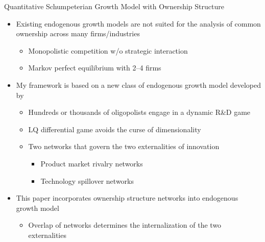 \documentclass[
  10pt,
  aspectratio=169,   %
]{beamer}
\theoremstyle{plain}
\begin{document}
\begin{frame}{Quantitative Schumpeterian Growth Model with Ownership Structure}
  \begin{itemize}
    \item Existing endogenous growth models are not suited for the analysis of common ownership across many firms/industries
          \begin{itemize}
            \item Monopolistic competition w/o strategic interaction \citep{Romer1990-cw,Klette2004-gz}
            \item Markov perfect equilibrium with 2--4 firms \citep{Aghion2001-yc,Cavenaile2023-lo}
          \end{itemize}
          \medskip{}\pause
    \item My framework is based on a new class of endogenous growth model developed by \citet{Hopenhayn2024-ya}
          \begin{itemize}
            \item Hundreds or thousands of oligopolists engage in a dynamic R\&D game
            \item LQ differential game avoids the curse of dimensionality
            \item Two networks that govern the two externalities of innovation
                  \begin{itemize}
                    \item \alert{Product market rivalry networks} \citep{Pellegrino2024-dn}
                    \item \alert{Technology spillover networks} \citep{Bloom2013-pn}
                  \end{itemize}
          \end{itemize}
          \medskip{}\pause
    \item This paper incorporates \alert{ownership structure networks} into endogenous growth model
          \begin{itemize}
            \item Overlap of networks determines the internalization of the two externalities
          \end{itemize}
  \end{itemize}
\end{frame}
\end{document}
